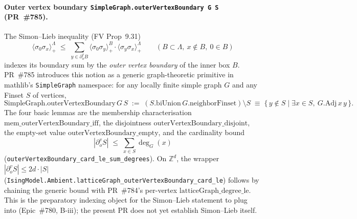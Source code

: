 \documentclass[a4paper,11pt]{article}
\begin{document}
\paragraph{Outer vertex boundary
\texttt{SimpleGraph.outerVertexBoundary G S} (PR~\#785).}
The Simon--Lieb inequality (FV Prop~9.31)
\[
  \langle \sigma_0 \sigma_x \rangle_+^{\Lambda}
  \;\le\; \sum_{y \in \partial^v_o B}
    \langle \sigma_0 \sigma_y \rangle_+^{B}
    \cdot \langle \sigma_y \sigma_x \rangle_+^{\Lambda}
  \qquad (B \subset \Lambda,\ x \notin B,\ 0 \in B)
\]
indexes its boundary sum by the \emph{outer vertex boundary} of
the inner box $B$. PR~\#785 introduces this notion as a generic
graph-theoretic primitive in mathlib's \texttt{SimpleGraph}
namespace: for any locally finite simple graph $G$ and any Finset
$S$ of vertices,
\[
  \mathrm{SimpleGraph.outerVertexBoundary}\,G\,S
  \;:=\; (S.\mathrm{biUnion}\,G.\mathrm{neighborFinset}) \setminus S
  \;\equiv\; \{\,y \notin S \mid \exists x \in S,\ G.\mathrm{Adj}\,x\,y\,\}.
\]
The four basic lemmas are the membership characterisation
$\mathrm{mem\_outerVertexBoundary\_iff}$, the disjointness
$\mathrm{outerVertexBoundary\_disjoint}$, the empty-set value
$\mathrm{outerVertexBoundary\_empty}$, and the cardinality bound
\[
  |\partial^v_o S| \;\le\; \sum_{x \in S} \deg_G(x)
\]
(\texttt{outerVertexBoundary\_card\_le\_sum\_degrees}). On
$\mathbb Z^d$, the wrapper
$|\partial^v_o S| \le 2 d \cdot |S|$
(\texttt{IsingModel.Ambient.latticeGraph\_outerVertexBoundary\_card\_le})
follows by chaining the generic bound with PR~\#784's per-vertex
$\mathrm{latticeGraph\_degree\_le}$. This is the preparatory
indexing object for the Simon--Lieb statement to plug into
(Epic~\#780, B-iii); the present PR does not yet establish
Simon--Lieb itself.
\end{document}
